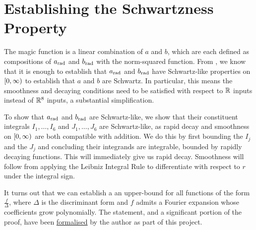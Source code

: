 \section{Establishing the Schwartzness Property}
\label{Ch4:Sec:Schwartzness}

The magic function is a linear combination of $a$ and $b$, which are each defined as compositions of $a_{\operatorname{rad}}$ and $b_{\operatorname{rad}}$ with the norm-squared function. From , we know that it is enough to establish that $a_{\operatorname{rad}}$ and $b_{\operatorname{rad}}$ have Schwartz-like properties on $\left[0, \infty\right)$ to establish that $a$ and $b$ are Schwartz. In particular, this means the smoothness and decaying conditions need to be satisfied with respect to $\mathbb{R}$ inputs instead of $\mathbb{R}^8$ inputs, a substantial simplification.

To show that $a_{\operatorname{rad}}$ and $b_{\operatorname{rad}}$ are Schwartz-like, we show that their constituent integrals $I_1, \ldots, I_6$ and $J_1, \ldots, J_6$ are Schwartz-like, as rapid decay and smoothness on $\left[0, \infty\right)$ are both compatible with addition. We do this by first bounding the $I_j$ and the $J_j$ and concluding their integrands are integrable, bounded by rapidly decaying functions. This will immediately give us rapid decay. Smoothness will follow from applying the Leibniz Integral Rule to differentiate with respect to $r$ under the integral sign.

It turns out that we can establish a an upper-bound for all functions of the form $\frac{f}{\Delta}$, where $\Delta$ is the discriminant form and $f$ admits a Fourier expansion whose coefficients grow polynomially. The statement, and a significant portion of the proof, have been \href{https://github.com/thefundamentaltheor3m/Sphere-Packing-Lean/blob/704c085b1251cc0c208cc373f4e6105af359edd4/SpherePacking/MagicFunction/PolyFourierCoeffBound.lean#L355}{formalised} by the author as part of this project.

